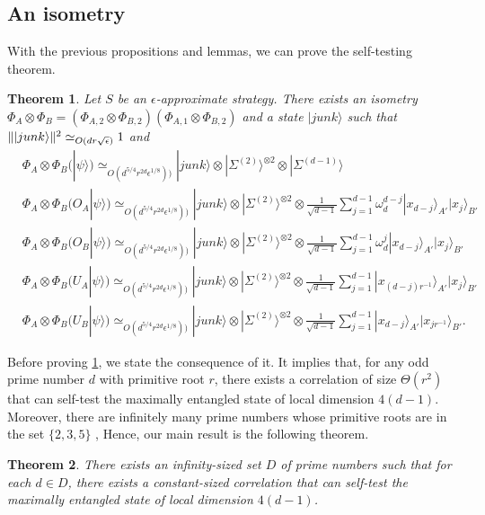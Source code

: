 \documentclass[11pt,letterpaper]{article}
\newcommand{\ket}[1]{|#1\rangle}
\newcommand{\x}{\otimes}
\DeclarePairedDelimiter{\norm}{\lVert}{\rVert}
\newcommand{\1}{\mathbb{1}}
\newcommand{\EPR}[1]{\Sigma^{(#1)}}
\newcommand{\ep}{\epsilon}
\newcommand{\se}{\sqrt{\epsilon}}
\newcommand{\appd}[1]{\simeq_{#1}}
\newtheorem{theorem}{Theorem}[section]
\theoremstyle{definition}
\begin{document}
\subsection{An isometry}
\label{sec:isometry}
With the previous propositions and lemmas, we can prove the self-testing theorem.
\begin{theorem}
	\label{thm:self-test}
	Let $S$ be an $\ep$-approximate strategy.
	There exists an isometry   
	$\Phi_A \x \Phi_B = (\Phi_{A,2} \x \Phi_{B,2})(\Phi_{A,1}\x\Phi_{B,2})$ and a state $\ket{junk}$
	such that $\norm{\ket{junk}}^2 \appd{O(dr\se)} 1$ and 
	\begin{align}
		&\Phi_A \x \Phi_B (\ket{\psi}) \appd{O(d^{5/4} r^{2d} \ep^{1/8}))} \ket{junk} \x \ket{\EPR{2}}^{\x 2} \x \ket{\EPR{d-1}}\\	
		&\Phi_A \x \Phi_B (O_A\ket{\psi}) \appd{O(d^{5/4} r^{2d}\ep^{1/8}))} \ket{junk} \x \ket{\EPR{2}}^{\x 2} \x
		\frac{1}{\sqrt{d-1}}\sum_{j=1}^{d-1} \omega_d^{d-j}\ket{x_{d-j}}_{A'}\ket{x_j}_{B'} \\
		&\Phi_A \x \Phi_B (O_B\ket{\psi}) \appd{O(d^{5/4}r^{2d} \ep^{1/8}))} \ket{junk} \x \ket{\EPR{2}}^{\x 2} \x
		\frac{1}{\sqrt{d-1}}\sum_{j=1}^{d-1} \omega_d^{j}\ket{x_{d-j}}_{A'}\ket{x_j}_{B'}\\
		&\Phi_A \x \Phi_B (U_A\ket{\psi}) \appd{O(d^{5/4} r^{2d}  \ep^{1/8}))} \ket{junk} \x \ket{\EPR{2}}^{\x 2} \x
		\frac{1}{\sqrt{d-1}}\sum_{j=1}^{d-1} \ket{x_{(d-j)r^{-1}}}_{A'}\ket{x_j}_{B'} \\
		&\Phi_A \x \Phi_B (U_B\ket{\psi}) \appd{O(d^{5/4} r^{2d}\ep^{1/8}))} \ket{junk} \x \ket{\EPR{2}}^{\x 2} \x
		\frac{1}{\sqrt{d-1}}\sum_{j=1}^{d-1} \ket{x_{d-j}}_{A'}\ket{x_{j r^{-1}}}_{B'}.
	\end{align}
\end{theorem}
Before proving \cref{thm:self-test}, we state the consequence of it.
It implies that,
for any odd prime number $d$ with primitive root $r$, 
there exists a correlation of size $\Theta(r^2)$ that can self-test the maximally
entangled state of local dimension $4(d-1)$.
Moreover, there are infinitely many prime numbers
whose primitive roots are in the set $\{2,3,5\}$ \cite{murty1988},
Hence, our main result is the following theorem.
\begin{theorem}
	There exists an infinity-sized set $D$ of prime numbers such that 
	for each $d \in D$, there exists
	a constant-sized correlation that can self-test the maximally entangled state
	of local dimension $4(d-1)$.
\end{theorem}
\end{document}
